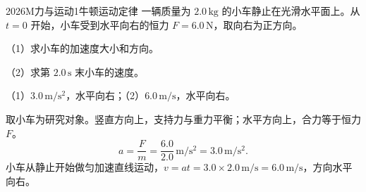 \begin{problem}{2026}{M}{力与运动}{1}{牛顿运动定律}
一辆质量为 $2.0\,\mathrm{kg}$ 的小车静止在光滑水平面上。从 $t=0$ 开始，小车受到水平向右的恒力 $F=6.0\,\mathrm{N}$，取向右为正方向。

（1）求小车的加速度大小和方向。

（2）求第 $2.0\,\mathrm{s}$ 末小车的速度。
\end{problem}

\begin{answer}
（1）$3.0\,\mathrm{m/s^2}$，水平向右；（2）$6.0\,\mathrm{m/s}$，水平向右。
\end{answer}

\begin{solutions}[解析]
取小车为研究对象。竖直方向上，支持力与重力平衡；水平方向上，合力等于恒力 $F$。
\[
 a=\frac{F}{m}=\frac{6.0}{2.0}\,\mathrm{m/s^2}=3.0\,\mathrm{m/s^2}.
\]
小车从静止开始做匀加速直线运动，$v=at=3.0\times 2.0\,\mathrm{m/s}=6.0\,\mathrm{m/s}$，方向水平向右。
\end{solutions}
